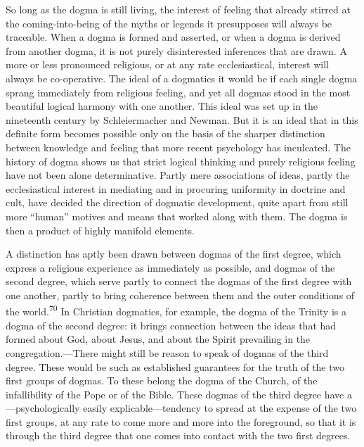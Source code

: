 \documentclass[12pt,a4paper]{book}
\newcommand{\opage}[1]{\marginnote{\footnotesize\textit{[#1]}}}
\begin{document}
So long as the dogma is still living, the 
\opage{136}interest of feeling that already stirred at the
coming-into-being of the myths or legends it presupposes will always be traceable. When a dogma is
formed and asserted, or when a dogma is derived from another dogma, it is not purely disinterested
inferences that are drawn. A more or less pronounced religious, or at any rate ecclesiastical,
interest will always be co-operative. The ideal of a dogmatics it would be if each single dogma sprang
immediately from religious feeling, and yet all dogmas stood in the most beautiful logical harmony
with one another. This ideal was set up in the nineteenth century by Schleiermacher and Newman. But it
is an ideal that in this definite form becomes possible only on the basis of the sharper distinction
between knowledge and feeling that more recent psychology has inculcated. The history of dogma shows
us that strict logical thinking and purely religious feeling have not been alone determinative. Partly
mere associations of ideas, partly the ecclesiastical interest in mediating and in procuring uniformity
in doctrine and cult, have decided the direction of dogmatic development, quite apart from still more
``human'' motives and means that worked along with them. The dogma is then a product of highly manifold
elements.

A distinction has aptly been drawn between dogmas of the first degree, which express a religious
experience as immediately as possible, and dogmas of the second degree, which serve partly to connect
the dogmas of the first degree with one another, partly to bring coherence between them and the outer
conditions of the world.\textsuperscript{70} In Christian dogmatics, for example, the dogma of the
Trinity is a dogma of the second degree: it brings connection between the ideas that had formed about
God, about Jesus, and about the Spirit prevailing in the congregation.---There might still be reason to
speak of dogmas of the third degree. These would be such as established guarantees for the truth of the
two first groups of dogmas. To these belong the dogma of the Church, of the infallibility of the Pope
or of the Bible. These dogmas of the third degree have a---psychologically easily explicable---tendency
to spread at the expense of the two first groups, at any rate to come more and more into the
foreground, so that it is through the third degree that one comes into contact with the two first
degrees.

\medskip
\end{document}
